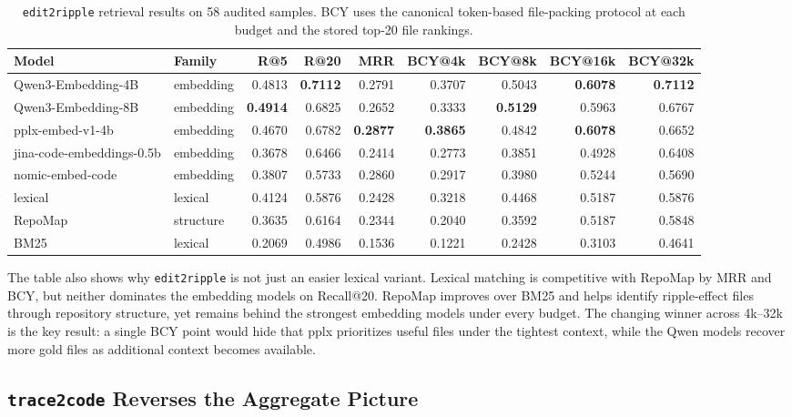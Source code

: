 \documentclass[11pt]{article}
\newcommand{\code}[1]{\texttt{#1}}
\begin{document}
\begin{table}[t]
\centering
\caption{\code{edit2ripple} retrieval results on 58 audited samples. BCY uses the canonical token-based file-packing protocol at each budget and the stored top-20 file rankings.}
\label{tab:edit2ripple}
\scriptsize
\setlength{\tabcolsep}{5.8pt}
\begin{tabular}{llrrrrrrr}
\toprule
Model & Family & R@5 & R@20 & MRR & BCY@4k & BCY@8k & BCY@16k & BCY@32k \\
\midrule
Qwen3-Embedding-4B & embedding & 0.4813 & \textbf{0.7112} & 0.2791 & 0.3707 & 0.5043 & \textbf{0.6078} & \textbf{0.7112} \\
Qwen3-Embedding-8B & embedding & \textbf{0.4914} & 0.6825 & 0.2652 & 0.3333 & \textbf{0.5129} & 0.5963 & 0.6767 \\
pplx-embed-v1-4b & embedding & 0.4670 & 0.6782 & \textbf{0.2877} & \textbf{0.3865} & 0.4842 & \textbf{0.6078} & 0.6652 \\
jina-code-embeddings-0.5b & embedding & 0.3678 & 0.6466 & 0.2414 & 0.2773 & 0.3851 & 0.4928 & 0.6408 \\
nomic-embed-code & embedding & 0.3807 & 0.5733 & 0.2860 & 0.2917 & 0.3980 & 0.5244 & 0.5690 \\
\midrule
lexical & lexical & 0.4124 & 0.5876 & 0.2428 & 0.3218 & 0.4468 & 0.5187 & 0.5876 \\
RepoMap & structure & 0.3635 & 0.6164 & 0.2344 & 0.2040 & 0.3592 & 0.5187 & 0.5848 \\
BM25 & lexical & 0.2069 & 0.4986 & 0.1536 & 0.1221 & 0.2428 & 0.3103 & 0.4641 \\
\bottomrule
\end{tabular}
\end{table}

The table also shows why \code{edit2ripple} is not just an easier lexical variant. Lexical matching is competitive with RepoMap by MRR and BCY, but neither dominates the embedding models on Recall@20. RepoMap improves over BM25 and helps identify ripple-effect files through repository structure, yet remains behind the strongest embedding models under every budget. The changing winner across 4k--32k is the key result: a single BCY point would hide that pplx prioritizes useful files under the tightest context, while the Qwen models recover more gold files as additional context becomes available.

\subsection{\code{trace2code} Reverses the Aggregate Picture}
\end{document}
